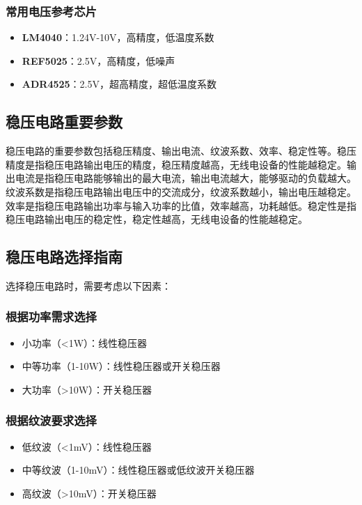 \documentclass[12pt,UTF8]{ctexbook}
\begin{document}
\subsubsection{常用电压参考芯片}

\begin{itemize}
    \item \textbf{LM4040}：1.24V-10V，高精度，低温度系数
    \item \textbf{REF5025}：2.5V，高精度，低噪声
    \item \textbf{ADR4525}：2.5V，超高精度，超低温度系数
\end{itemize}

\subsection{稳压电路重要参数}

稳压电路的重要参数包括稳压精度、输出电流、纹波系数、效率、稳定性等。稳压精度是指稳压电路输出电压的精度，稳压精度越高，无线电设备的性能越稳定。输出电流是指稳压电路能够输出的最大电流，输出电流越大，能够驱动的负载越大。纹波系数是指稳压电路输出电压中的交流成分，纹波系数越小，输出电压越稳定。效率是指稳压电路输出功率与输入功率的比值，效率越高，功耗越低。稳定性是指稳压电路输出电压的稳定性，稳定性越高，无线电设备的性能越稳定。

\subsection{稳压电路选择指南}

选择稳压电路时，需要考虑以下因素：

\subsubsection{根据功率需求选择}
\begin{itemize}
    \item 小功率（<1W）：线性稳压器
    \item 中等功率（1-10W）：线性稳压器或开关稳压器
    \item 大功率（>10W）：开关稳压器
\end{itemize}

\subsubsection{根据纹波要求选择}
\begin{itemize}
    \item 低纹波（<1mV）：线性稳压器
    \item 中等纹波（1-10mV）：线性稳压器或低纹波开关稳压器
    \item 高纹波（>10mV）：开关稳压器
\end{itemize}
\end{document}

